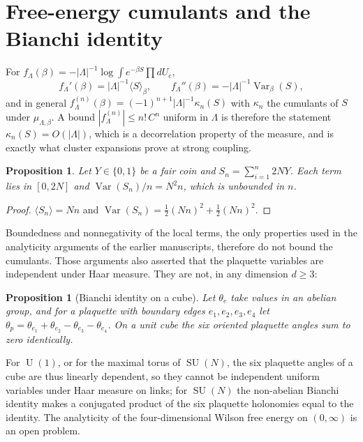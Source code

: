 \documentclass[aps,prd,twocolumn,superscriptaddress,nofootinbib,floatfix]{revtex4-2}
\newtheorem{proposition}[theorem]{Proposition}
\theoremstyle{definition}
\theoremstyle{remark}
\DeclareMathOperator{\SU}{SU}
\DeclareMathOperator{\U}{U}
\DeclareMathOperator{\Var}{Var}
\begin{document}
\section{Free-energy cumulants and the Bianchi identity}
\label{sec:cumulant}

For $f_\Lambda(\beta)=-|\Lambda|^{-1}\log\int e^{-\beta S}\prod dU_e$,
\begin{equation}
f_\Lambda'(\beta)=|\Lambda|^{-1}\langle S\rangle_\beta,\qquad
f_\Lambda''(\beta)=-|\Lambda|^{-1}\Var_\beta(S),
\label{eq:derivs}
\end{equation}
and in general $f^{(n)}_\Lambda(\beta)=(-1)^{n+1}|\Lambda|^{-1}\kappa_n(S)$
with $\kappa_n$ the cumulants of $S$ under $\mu_{\Lambda,\beta}$. A bound
$|f^{(n)}_\Lambda|\le n!\,C^n$ uniform in $\Lambda$ is therefore the
statement $\kappa_n(S)=O(|\Lambda|)$, which is a decorrelation property of
the measure, and is exactly what cluster expansions prove at strong
coupling.

\begin{proposition}
\label{prop:counter}
Let $Y\in\{0,1\}$ be a fair coin and $S_n=\sum_{i=1}^n2NY$. Each term lies
in $[0,2N]$ and $\Var(S_n)/n=N^2n$, which is unbounded in $n$.
\end{proposition}

\begin{proof}
$\langle S_n\rangle=Nn$ and $\Var(S_n)=\tfrac12(Nn)^2+\tfrac12(Nn)^2$.
\end{proof}

Boundedness and nonnegativity of the local terms, the only properties used
in the analyticity arguments of the earlier manuscripts, therefore do not
bound the cumulants. Those arguments also asserted that the plaquette
variables are independent under Haar measure. They are not, in any
dimension $d\ge3$:

\begin{proposition}[Bianchi identity on a cube]
\label{prop:bianchi}
Let $\theta_e$ take values in an abelian group, and for a plaquette with
boundary edges $e_1,e_2,e_3,e_4$ let
$\theta_p=\theta_{e_1}+\theta_{e_2}-\theta_{e_3}-\theta_{e_4}$. On a unit
cube the six oriented plaquette angles sum to zero identically.
\end{proposition}

For $\U(1)$, or for the maximal torus of $\SU(N)$, the six plaquette angles
of a cube are thus linearly dependent, so they cannot be independent
uniform variables under Haar measure on links; for $\SU(N)$ the
non-abelian Bianchi identity makes a conjugated product of the six plaquette
holonomies equal to the identity. The analyticity of the
four-dimensional Wilson free energy on $(0,\infty)$ is an open problem.
\end{document}

